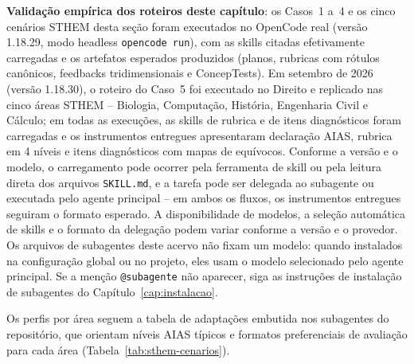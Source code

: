 \begin{dicaopencode}
\textbf{Valida{\c c}{\~a}o emp{\'i}rica dos roteiros deste cap{\'i}tulo}: os Casos~1 a~4 e os cinco cen{\'a}rios STHEM desta se{\c c}{\~a}o foram executados no OpenCode real (vers{\~a}o 1.18.29, modo headless \texttt{opencode run}), com as skills citadas efetivamente carregadas e os artefatos esperados produzidos (planos, rubricas com r{\'o}tulos can{\^o}nicos, feedbacks tridimensionais e ConcepTests). Em setembro de 2026 (vers{\~a}o 1.18.30), o roteiro do Caso~5 foi executado no Direito e replicado nas cinco {\'a}reas STHEM -- Biologia, Computa{\c c}{\~a}o, Hist{\'o}ria, Engenharia Civil e C{\'a}lculo; em todas as execu{\c c}{\~o}es, as skills de rubrica e de itens diagn{\'o}sticos foram carregadas e os instrumentos entregues apresentaram declara{\c c}{\~a}o AIAS, rubrica em 4 n{\'i}veis e itens diagn{\'o}sticos com mapas de equ{\'i}vocos. Conforme a vers{\~a}o e o modelo, o carregamento pode ocorrer pela ferramenta de skill ou pela leitura direta dos arquivos \texttt{SKILL.md}, e a tarefa pode ser delegada ao subagente ou executada pelo agente principal -- em ambos os fluxos, os instrumentos entregues seguiram o formato esperado. A disponibilidade de modelos, a sele{\c c}{\~a}o autom{\'a}tica de skills e o formato da delega{\c c}{\~a}o podem variar conforme a vers{\~a}o e o provedor. Os arquivos de subagentes deste acervo n{\~a}o fixam um modelo: quando instalados na configura{\c c}{\~a}o global ou no projeto, eles usam o modelo selecionado pelo agente principal. Se a men{\c c}{\~a}o \texttt{@subagente} n{\~a}o aparecer, siga as instru{\c c}{\~o}es de instala{\c c}{\~a}o de subagentes do Cap{\'i}tulo~\ref{cap:instalacao}.
\end{dicaopencode}

Os perfis por {\'a}rea seguem a tabela de adapta{\c c}{\~o}es embutida nos subagentes do reposit{\'o}rio, que orientam n{\'i}veis AIAS t{\'i}picos e formatos preferenciais de avalia{\c c}{\~a}o para cada {\'a}rea (Tabela~\ref{tab:sthem-cenarios}).

